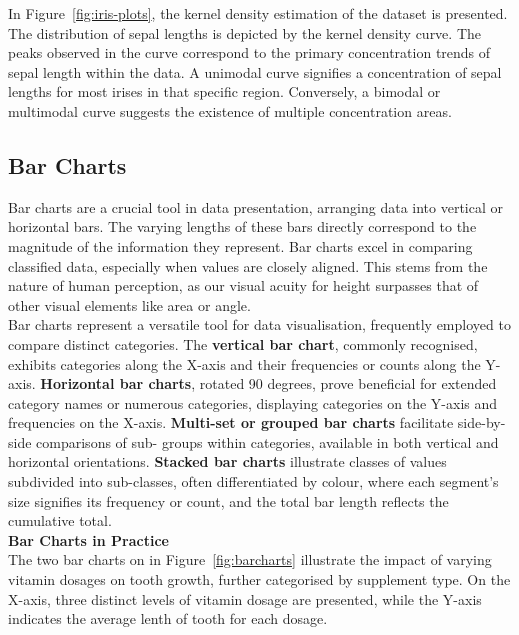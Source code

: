 \documentclass{article}\usepackage[]{graphicx}\usepackage[]{xcolor}
\numberwithin{equation}{section}
\begin{document}
\noindent In Figure~\ref{fig:iris-plots}, the kernel density estimation of the dataset is presented. The distribution of sepal lengths is depicted by the kernel density curve. The peaks observed in the curve correspond to the primary concentration trends of sepal length within the data. A unimodal curve signifies a concentration of sepal lengths for most irises in that specific region. Conversely, a bimodal or multimodal curve suggests the existence of multiple concentration areas.

\subsection{Bar Charts}
\noindent Bar charts are a crucial tool in data presentation, arranging data into vertical or horizontal bars. The varying lengths of these bars directly correspond to the magnitude of the information they represent. Bar charts excel in comparing classified data, especially when values are closely aligned. This stems from the nature of human perception, as our visual acuity for height surpasses that of other visual elements like area or angle.\\

\noindent Bar charts represent a versatile tool for data visualisation, frequently employed to compare distinct categories. The \textbf{vertical bar chart}, commonly recognised, exhibits categories along the X-axis and their frequencies or counts along the Y-axis. \textbf{Horizontal bar charts}, rotated 90 degrees, prove beneficial for extended category names or numerous categories, displaying categories on the Y-axis and frequencies on the X-axis. \textbf{Multi-set or grouped bar charts} facilitate side-by-side comparisons of sub- groups within categories, available in both vertical and horizontal orientations. \textbf{Stacked bar charts} illustrate classes of values subdivided into sub-classes, often differentiated by colour, where each segment's size signifies its frequency or count, and the total bar length reflects the cumulative total.\\

\noindent \textbf{Bar Charts in Practice}\\
\noident The two bar charts on in Figure~\ref{fig:barcharts} illustrate the impact of varying vitamin dosages on tooth growth, further categorised by supplement type. On the X-axis, three distinct levels of vitamin dosage are presented, while the Y-axis indicates the average lenth of tooth for each dosage.
\end{document}
